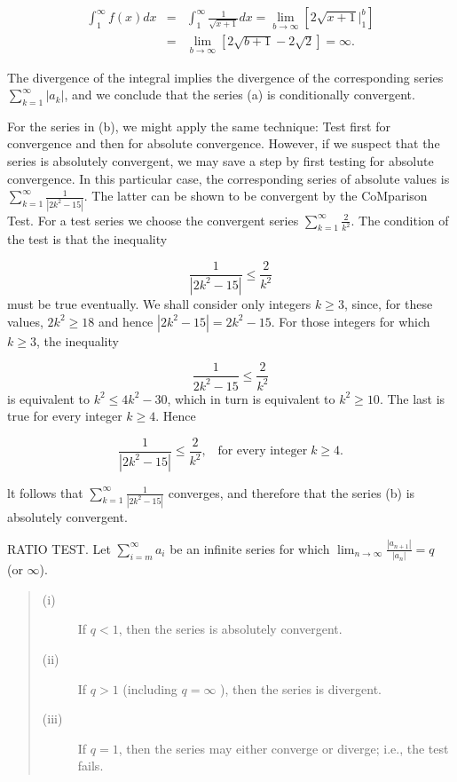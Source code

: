 \begin{example}
\begin{eqnarray*}
\int_1^\infty f(x) dx &=& \int_1^\infty \frac{1}{\sqrt{x + 1}} dx = \lim_{b \rightarrow \infty} [2 \sqrt{x + 1}|_1^b ] \\
&=& \lim_{b \rightarrow \infty} [2\sqrt{b + 1} - 2 \sqrt2] = \infty .
\end{eqnarray*}

\noindent The divergence of the integral implies the divergence of the corresponding series $\sum_{k=1}^\infty |a_k|$, and we conclude that the series (a) is conditionally convergent.

For the series in (b), we might apply the same technique: Test first for convergence and then for absolute convergence. However, if we suspect that the series is absolutely convergent, we may save a step by first testing for absolute convergence. In this particular case, the corresponding series of absolute values is $ \sum_{k = 1}^\infty \frac{1}{|2k^2 - 15|}$. The latter can be shown to be convergent
by the CoMparison Test. For a test series we choose the convergent series $\sum_{k=1}^\infty \frac{2}{k^2}$. The condition of the test is that the inequality

$$
\frac{1}{|2k^2 - 15|} \leq \frac{2}{k^2}
$$
\noindent must be true eventually. We shall consider only integers $k \geq 3$, since, for these values, $2k^2 \geq18$ and hence $|2k^2 - 15| = 2k^2 - 15$. For those integers for which $k \geq 3$, the inequality

$$
\frac{1}{2k^2 - 15} \leq \frac{2}{k^2}
$$
\noindent is equivalent to $k^2 \leq 4k^2 - 30$, which in turn is equivalent to $k^2 \geq 10$. The last is true for every integer $k \geq 4$. Hence

$$
\frac{1}{|2k^2 - 15|} \leq \frac{2}{k^2}, \;\;\;\mbox{for every integer}\; k \geq 4.
$$

\noindent lt follows that $\sum_{k=1}^\infty \frac{1}{|2k^2 - 15|}$ converges, and therefore that the series (b) is absolutely convergent.
\end{example}

\begin{theorem} RATIO TEST. Let $\sum_{i=m}^\infty a_i$ be an infinite series for which \linebreak
$\lim_{n \rightarrow \infty} \frac{|a_{n+1}|}{|a_n|} = q$ (or $\infty$). 

\begin{quote}
\begin{description}
\item[(i)] If $q < 1$, then the series is absolutely convergent.
\item[(ii)] If $q > 1$ (including $q = \infty$ ), then the series is divergent.
\item[(iii)] If $q = 1$, then the series may either converge or diverge; i.e., the test fails.
\end{description}
\end{quote}
\end{theorem}


